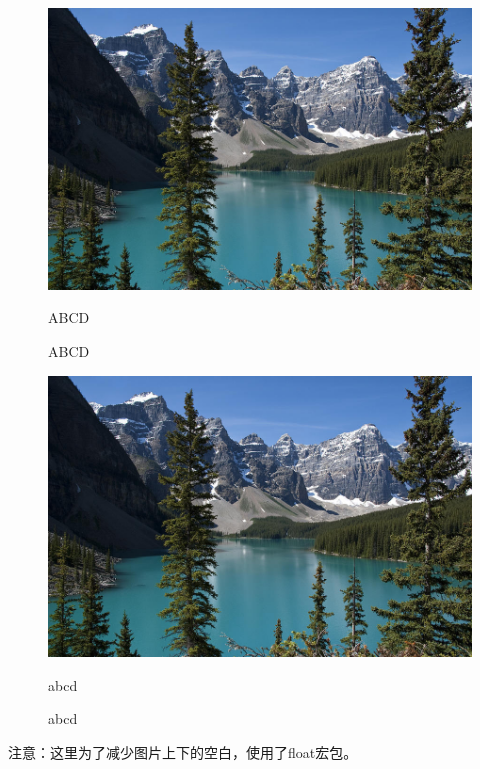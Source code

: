 \begin{figure}
	\begin{minipage}[t]{0.5\linewidth}
		\centering
		\includegraphics[scale=0.5]{./figures/Example.jpg}
		\caption{ABCD}
		
		\addtocounter{figure}{-1}
		\vspace{-5pt}
		\renewcommand{\figurename}{Figure}
		\caption{ABCD}
		
		\label{fig:side:a}
	\end{minipage}%
	\begin{minipage}[t]{0.5\linewidth}
		\centering
		\includegraphics[scale=0.5]{./figures/Example.jpg}
		\caption{abcd}
		
		\addtocounter{figure}{-1}
		\vspace{-5pt}
		\renewcommand{\figurename}{Figure}
		\caption{abcd}
		
		\label{fig:side:b}
	\end{minipage}
\end{figure}

\par 注意：这里为了减少图片上下的空白，使用了float宏包。